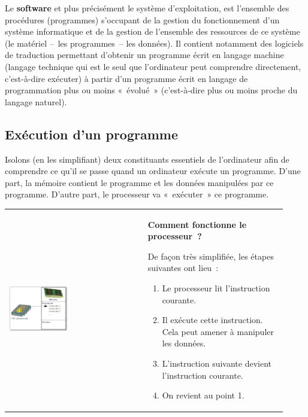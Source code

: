 			Le \textbf{software} et plus précisément le système d'exploitation,
			est l’ensemble des procédures (programmes) s’occupant de la gestion
			du fonctionnement d’un système informatique et de la gestion de
			l’ensemble des ressources de ce système (le matériel –~les
			programmes~– les données).  Il contient notamment des logiciels de
			traduction permettant d’obtenir un programme écrit en langage
			machine (langage technique qui est le seul que l’ordinateur peut
			comprendre directement, c’est-à-dire exécuter) à partir d’un
			programme écrit en langage de programmation plus ou moins «~évolué~»
			(c’est-à-dire plus ou moins proche du langage naturel).
	
		\subsection{Exécution d’un programme}
		
			Isolons (en les simplifiant) deux constituants essentiels de
			l’ordinateur afin de comprendre ce qu'il se passe quand un
			ordinateur exécute un programme.  D’une part, la mémoire contient le
			programme et les données manipulées par ce programme.  D’autre part,
			le processeur va «~exécuter~» ce programme.
	
			\begin{tabular}{m{0.46\linewidth}m{0.46\linewidth}}
				\begin{center}
				\includegraphics[width=0.45\textwidth]{images/intro-schema-ordi}
				\end{center}
			&
				\textbf{Comment fonctionne le processeur~?}
		
				De façon très simplifiée, les étapes suivantes ont lieu~:
		
				\medskip
				\begin{flushleft}
				\begin{enumerate}
				\item Le processeur lit l’instruction courante.
				\item Il exécute cette instruction. Cela peut amener à manipuler les données.
				\item L’instruction suivante devient l’instruction courante.
				\item On revient au point 1.
				\end{enumerate}
				\end{flushleft}
			\\
			\end{tabular}
	
